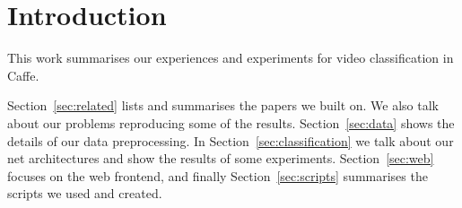 \section{Introduction}
\label{sec:introduction}

This work summarises our experiences and experiments for video classification in Caffe.

Section~\ref{sec:related} lists and summarises the papers we built on.
We also talk about our problems reproducing some of the results.
Section~\ref{sec:data} shows the details of our data preprocessing.
In Section~\ref{sec:classification} we talk about our net architectures and show the results of some experiments.
Section~\ref{sec:web} focuses on the web frontend, and finally Section~\ref{sec:scripts} summarises the scripts we used and created.

